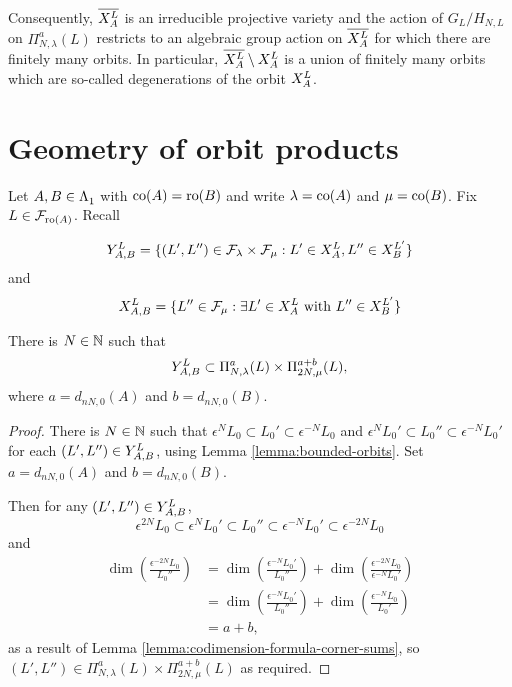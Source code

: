 \documentclass[a4paper, 11pt]{report}
\begin{document}
Consequently, $\overline{\xprod[L]{A}}$ is an irreducible projective variety and the action of $G_L/{H_{N,L}}$ on $\Pi_{N,\lambda}^a(L)$ restricts to an algebraic group action on $\overline{\xprod[L]{A}}$ for which there are finitely many orbits. In particular, $\overline{\xprod[L]{A}}\setminus\xprod[L]{A}$ is a union of finitely many orbits which are so-called degenerations of the orbit $\xprod[L]{A}$.


\section{Geometry of orbit products}

Let $A,B\in\matrices$ with $\co{A}=\ro{B}$ and write $\lambda=\co{A}$ and $\mu=\co{B}$. Fix $L\in\flags_{\ro{A}}$. Recall

\begin{equation*}
\yprod[L]{A,B}=\{(L',L'')\in\flags_{\lambda}\times\flags_{\mu}: L'\in\xprod[L]{A}, L''\in\xprod[L']{B}\}
\end{equation*}
and
\begin{equation*}
\xprod[L]{A,B}=\{L''\in\flags_{\mu}: \exists L'\in\xprod[L]{A} \text{ with } L''\in\xprod[L']{B}\}
\end{equation*}

\begin{lemma}\label{lemma:embedding-orbit-products}
There is $N\in\naturals$ such that
\begin{equation*}
\yprod[L]{A,B}\subset\Pi_{N,\lambda}^a(L)\times\Pi_{2N,\mu}^{a+b}(L),
\end{equation*}
where $a=d_{nN,0}{(A)}$ and $b=d_{nN,0}{(B)}$.
\end{lemma}

\begin{proof}
There is $N\in\naturals$ such that $\epsilon^N{L_0}\subset L_0'\subset\epsilon^{-N}L_0$ and $\epsilon^NL_0'\subset L_0''\subset\epsilon^{-N}L_0'$ for each $(L',L'')\in\yprod[L]{A,B}$, using Lemma \ref{lemma:bounded-orbits}. Set $a=d_{nN,0}{(A)}$ and $b=d_{nN,0}{(B)}$.

Then for any $(L',L'')\in\yprod[L]{A,B}$,
\begin{equation*}
\epsilon^{2N}L_0\subset\epsilon^NL_0'\subset L_0''\subset\epsilon^{-N}L_0'\subset\epsilon^{-2N}L_0
\end{equation*}
and
\begin{align*}
\dim\left(\frac{\epsilon^{-2N}L_0}{L_0''}\right)
&=\dim\left(\frac{\epsilon^{-N}L_0'}{L_0''}\right) + \dim\left(\frac{\epsilon^{-2N}L_0}{\epsilon^{-N}L_0'}\right)\\
&=\dim\left(\frac{\epsilon^{-N}L_0'}{L_0''}\right) + \dim\left(\frac{\epsilon^{-N}L_0}{L_0'}\right)\\
&= a+b,
\end{align*}
as a result of Lemma \ref{lemma:codimension-formula-corner-sums}, so $(L',L'')\in\Pi_{N,\lambda}^a(L)\times\Pi_{2N,\mu}^{a+b}(L)$ as required.
\end{proof}
\end{document}

